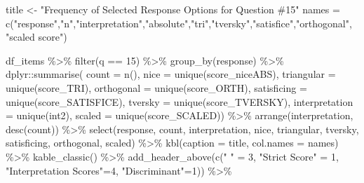 \documentclass[
  letterpaper,
  DIV=11,
  numbers=noendperiod]{scrreprt}
\newenvironment{Shaded}{\begin{snugshade}}{\end{snugshade}}
\newcommand{\AttributeTok}[1]{\textcolor[rgb]{0.40,0.45,0.13}{#1}}
\newcommand{\DecValTok}[1]{\textcolor[rgb]{0.68,0.00,0.00}{#1}}
\newcommand{\FunctionTok}[1]{\textcolor[rgb]{0.28,0.35,0.67}{#1}}
\newcommand{\NormalTok}[1]{\textcolor[rgb]{0.00,0.23,0.31}{#1}}
\newcommand{\OtherTok}[1]{\textcolor[rgb]{0.00,0.23,0.31}{#1}}
\newcommand{\SpecialCharTok}[1]{\textcolor[rgb]{0.37,0.37,0.37}{#1}}
\newcommand{\StringTok}[1]{\textcolor[rgb]{0.13,0.47,0.30}{#1}}
\begin{document}
\begin{Shaded}
\begin{Highlighting}[]
\NormalTok{title }\OtherTok{\textless{}{-}} \StringTok{"Frequency of Selected Response Options for Question \#15"}
\NormalTok{names }\OtherTok{=} \FunctionTok{c}\NormalTok{(}\StringTok{"response"}\NormalTok{,}\StringTok{"n"}\NormalTok{,}\StringTok{"interpretation"}\NormalTok{,}\StringTok{"absolute"}\NormalTok{,}\StringTok{"tri"}\NormalTok{,}\StringTok{"tversky"}\NormalTok{,}\StringTok{"satisfice"}\NormalTok{,}\StringTok{"orthogonal"}\NormalTok{, }\StringTok{"scaled score"}\NormalTok{)}

\NormalTok{df\_items }\SpecialCharTok{\%\textgreater{}\%} \FunctionTok{filter}\NormalTok{(q }\SpecialCharTok{==} \DecValTok{15}\NormalTok{) }\SpecialCharTok{\%\textgreater{}\%} \FunctionTok{group\_by}\NormalTok{(response) }\SpecialCharTok{\%\textgreater{}\%}
\NormalTok{  dplyr}\SpecialCharTok{::}\FunctionTok{summarise}\NormalTok{( }\AttributeTok{count =} \FunctionTok{n}\NormalTok{(),}
                    \AttributeTok{nice =} \FunctionTok{unique}\NormalTok{(score\_niceABS),}
                    \AttributeTok{triangular =} \FunctionTok{unique}\NormalTok{(score\_TRI),}
                    \AttributeTok{orthogonal =}  \FunctionTok{unique}\NormalTok{(score\_ORTH),}
                    \AttributeTok{satisficing =}  \FunctionTok{unique}\NormalTok{(score\_SATISFICE),}
                    \AttributeTok{tversky =} \FunctionTok{unique}\NormalTok{(score\_TVERSKY),}
                    \AttributeTok{interpretation =} \FunctionTok{unique}\NormalTok{(int2),}
                    \AttributeTok{scaled =} \FunctionTok{unique}\NormalTok{(score\_SCALED)) }\SpecialCharTok{\%\textgreater{}\%}
  \FunctionTok{arrange}\NormalTok{(interpretation, }\FunctionTok{desc}\NormalTok{(count)) }\SpecialCharTok{\%\textgreater{}\%}
  \FunctionTok{select}\NormalTok{(response, count, interpretation, nice,}
\NormalTok{         triangular, tversky, satisficing, orthogonal, scaled) }\SpecialCharTok{\%\textgreater{}\%}
  \FunctionTok{kbl}\NormalTok{(}\AttributeTok{caption =}\NormalTok{ title, }\AttributeTok{col.names =}\NormalTok{ names) }\SpecialCharTok{\%\textgreater{}\%}  \FunctionTok{kable\_classic}\NormalTok{() }\SpecialCharTok{\%\textgreater{}\%}
  \FunctionTok{add\_header\_above}\NormalTok{(}\FunctionTok{c}\NormalTok{(}\StringTok{" "} \OtherTok{=} \DecValTok{3}\NormalTok{, }\StringTok{"Strict Score"} \OtherTok{=} \DecValTok{1}\NormalTok{, }\StringTok{"Interpretation Scores"}\OtherTok{=}\DecValTok{4}\NormalTok{, }\StringTok{"Discriminant"}\OtherTok{=}\DecValTok{1}\NormalTok{)) }\SpecialCharTok{\%\textgreater{}\%}

\end{Highlighting}
\end{Shaded}
\end{document}
